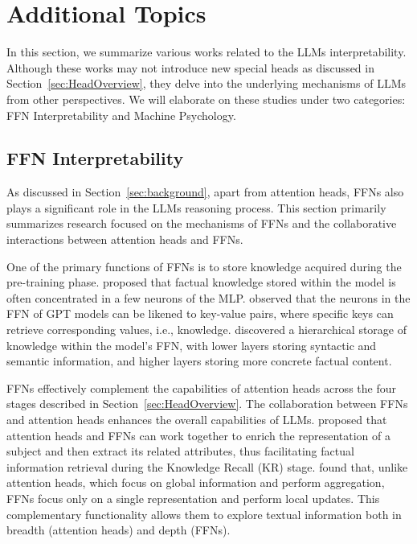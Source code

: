 \documentclass{article}
\begin{document}
\section{Additional Topics} \label{sec:other_tasks}
In this section, we summarize various works related to the LLMs interpretability. Although these works may not introduce new special heads as discussed in Section~\ref{sec:HeadOverview}, they delve into the underlying mechanisms of LLMs from other perspectives. We will elaborate on these studies under two categories: FFN Interpretability and Machine Psychology.

\subsection{FFN Interpretability} \label{subsec:OtherComponent}
As discussed in Section~\ref{sec:background}, apart from attention heads, FFNs also plays a significant role in the LLMs reasoning process. This section primarily summarizes research focused on the mechanisms of FFNs and the collaborative interactions between attention heads and FFNs.

One of the primary functions of FFNs is to store knowledge acquired during the pre-training phase. 
\citet{MLPKnowledge} proposed that factual knowledge stored within the model is often concentrated in a few neurons of the MLP.
\citet{TransformerKVpair} observed that the neurons in the FFN of GPT models can be likened to key-value pairs, where specific keys can retrieve corresponding values, i.e., knowledge.
\citet{FactualRecall_24_arXiv_RUC} discovered a hierarchical storage of knowledge within the model's FFN, with lower layers storing syntactic and semantic information, and higher layers storing more concrete factual content.

FFNs effectively complement the capabilities of attention heads across the four stages described in Section~\ref{sec:HeadOverview}. The collaboration between FFNs and attention heads enhances the overall capabilities of LLMs.
\citet{FacutalRecall_23_EMNLP_Google} proposed that attention heads and FFNs can work together to enrich the representation of a subject and then extract its related attributes, thus facilitating factual information retrieval during the Knowledge Recall (KR) stage.
\citet{MLPLocalUpdate_23_EMNLP_ETH} found that, unlike attention heads, which focus on global information and perform aggregation, FFNs focus only on a single representation and perform local updates. This complementary functionality allows them to explore textual information both in breadth (attention heads) and depth (FFNs).
\end{document}
